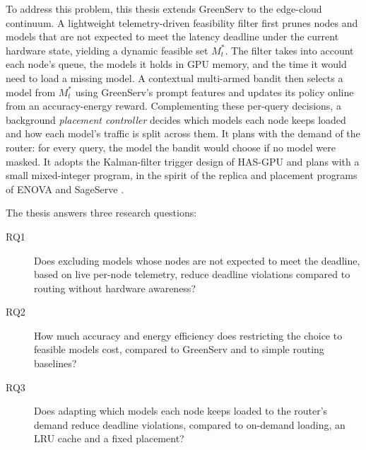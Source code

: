 To address this problem, this thesis extends GreenServ to the edge-cloud continuum.
A lightweight telemetry-driven feasibility filter first prunes nodes and models that are not expected to meet the latency deadline under the current hardware state, yielding a dynamic feasible set $M_t^*$.
The filter takes into account each node's queue, the models it holds in GPU memory, and the time it would need to load a missing model.
A contextual multi-armed bandit then selects a model from $M_t^*$ using GreenServ's prompt features and updates its policy online from an accuracy-energy reward.
Complementing these per-query decisions, a background \emph{placement controller} decides which models each node keeps loaded and how each model's traffic is split across them.
It plans with the demand of the router: for every query, the model the bandit would choose if no model were masked.
It adopts the Kalman-filter trigger design of HAS-GPU \cite{hasgpu} and plans with a small mixed-integer program, in the spirit of the replica and placement programs of ENOVA \cite{enova} and SageServe \cite{sageserve}.

The thesis answers three research questions:
\begin{description}
    \item[RQ1] Does excluding models whose nodes are not expected to meet the deadline, based on live per-node telemetry, reduce deadline violations compared to routing without hardware awareness?
    \item[RQ2] How much accuracy and energy efficiency does restricting the choice to feasible models cost, compared to GreenServ and to simple routing baselines?
    \item[RQ3] Does adapting which models each node keeps loaded to the router's demand reduce deadline violations, compared to on-demand loading, an LRU cache and a fixed placement?
\end{description}

